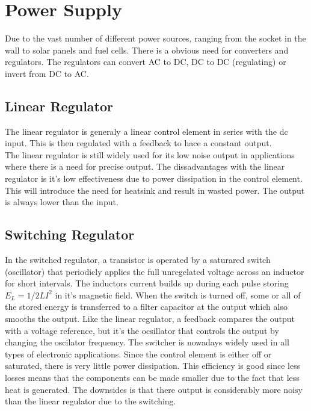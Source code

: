 \documentclass[12pt,a4paper]{article}
\begin{document}
  \section{Power Supply}
    Due to the vast number of different power sources, ranging from the
    socket in the wall to solar panels and fuel cells. There is a
    obvious need for converters and regulators. The regulators can
    convert AC to DC, DC to DC (regulating) or invert from DC to AC.

    \subsection{Linear Regulator}
    The linear regulator is generaly a linear control element in series
    with the dc input. This is then regulated with a feedback to hace a
    constant output. \\
    The linear regulator is still widely used for its low noise output
    in applications where there is a need for precise output. The
    dissadvantages with the linear regulator is it's low effectiveness
    due to power dissipation in the control element. This will introduce
    the need for heatsink and result in wasted power. The output is
    always lower than the input.


    \subsection{Switching Regulator}
    In the switched regulator, a transistor is operated by a saturared
    switch (oscillator) that periodicly applies the full unregelated voltage across
    an inductor for short intervals. The inductors current builds up
    during each pulse storing $E_L=1/2LI^2$ in it's magnetic field. 
    When the switch is turned off, some or all of the stored energy is
    transferred to a filter capacitor at the output which also smooths
    the output. Like the linear regulator, a feedback compares the
    output with a voltage reference, but it's the ocsillator that
    controls the output by changing the oscilator frequency.
    The switcher is nowadays widely used in all types of electronic
    applications. Since the control element is either off or saturated,
    there is very little power dissipation. This efficiency is good
    since less losses means that the components can be made smaller due
    to the fact that less heat is generated. The downsides is that there
    output is considerably more noisy than the linear regulator due to
    the switching. 
\end{document}
